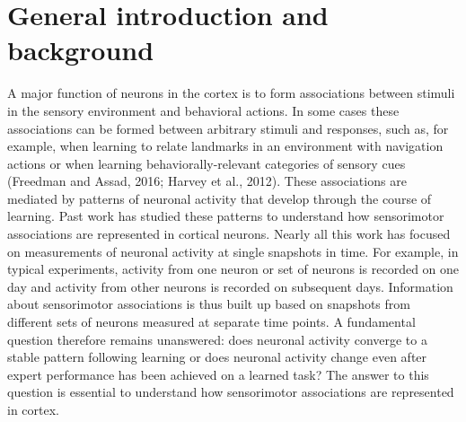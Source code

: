 \chapter{General introduction and background}
A major function of neurons in the cortex is to form associations between stimuli in the sensory environment and behavioral actions. In some cases these associations can be formed between arbitrary stimuli and responses, such as, for example, when learning to relate landmarks in an environment with navigation actions or when learning behaviorally-relevant categories of sensory cues\citep{Harvey:2012du} (Freedman and Assad, 2016; Harvey et al., 2012). These associations are mediated by patterns of neuronal activity that develop through the course of learning. \citep{Abbott2009} Past work has studied these patterns to understand how sensorimotor associations are represented in cortical neurons. Nearly all this work has focused on measurements of neuronal activity at single snapshots in time. For example, in typical experiments, activity from one neuron or set of neurons is recorded on one day and activity from other neurons is recorded on subsequent days. Information about sensorimotor associations is thus built up based on snapshots from different sets of neurons measured at separate time points. A fundamental question therefore remains unanswered: does neuronal activity converge to a stable pattern following learning or does neuronal activity change even after expert performance has been achieved on a learned task? The answer to this question is essential to understand how sensorimotor associations are represented in cortex.

\bigskip

